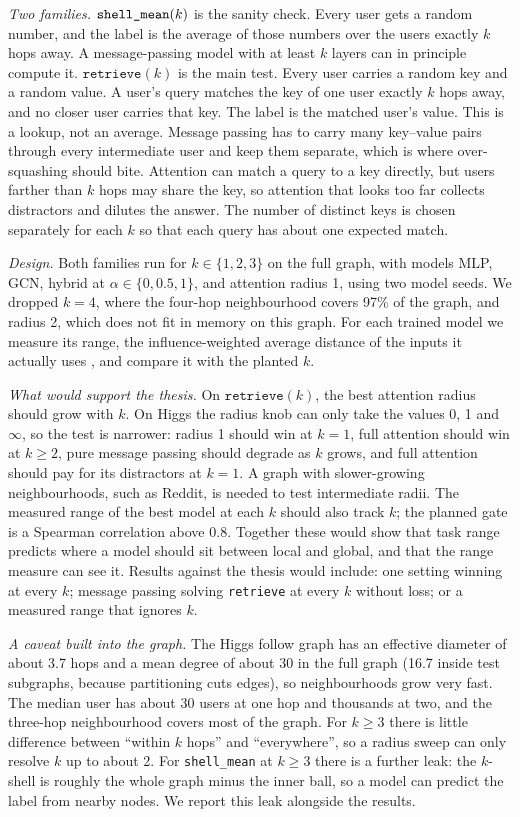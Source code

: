 \emph{Two families.} $\texttt{shell\_\allowbreak mean}(k)$ is the sanity check. Every user gets a random number, and the label is the average of those numbers over the users exactly $k$ hops away. A message-passing model with at least $k$ layers can in principle compute it. $\texttt{retrieve}(k)$ is the main test. Every user carries a random key and a random value. A user's query matches the key of one user exactly $k$ hops away, and no closer user carries that key. The label is the matched user's value. This is a lookup, not an average. Message passing has to carry many key--value pairs through every intermediate user and keep them separate, which is where over-squashing should bite. Attention can match a query to a key directly, but users farther than $k$ hops may share the key, so attention that looks too far collects distractors and dilutes the answer. The number of distinct keys is chosen separately for each $k$ so that each query has about one expected match.

\emph{Design.} Both families run for $k\in\{1,2,3\}$ on the full graph, with models MLP, GCN, hybrid at $\alpha\in\{0, 0.5, 1\}$, and attention radius 1, using two model seeds. We dropped $k=4$, where the four-hop neighbourhood covers 97\% of the graph, and radius 2, which does not fit in memory on this graph. For each trained model we measure its range, the influence-weighted average distance of the inputs it actually uses \citep{bamberger2025}, and compare it with the planted $k$.

\emph{What would support the thesis.} On $\texttt{retrieve}(k)$, the best attention radius should grow with $k$. On Higgs the radius knob can only take the values 0, 1 and $\infty$, so the test is narrower: radius 1 should win at $k=1$, full attention should win at $k\ge2$, pure message passing should degrade as $k$ grows, and full attention should pay for its distractors at $k=1$. A graph with slower-growing neighbourhoods, such as Reddit, is needed to test intermediate radii. The measured range of the best model at each $k$ should also track $k$; the planned gate is a Spearman correlation above 0.8. Together these would show that task range predicts where a model should sit between local and global, and that the range measure can see it. Results against the thesis would include: one setting winning at every $k$; message passing solving \texttt{retrieve} at every $k$ without loss; or a measured range that ignores $k$.

\emph{A caveat built into the graph.} The Higgs follow graph has an effective diameter of about 3.7 hops and a mean degree of about 30 in the full graph (16.7 inside test subgraphs, because partitioning cuts edges), so neighbourhoods grow very fast. The median user has about 30 users at one hop and thousands at two, and the three-hop neighbourhood covers most of the graph. For $k\ge3$ there is little difference between ``within $k$ hops'' and ``everywhere'', so a radius sweep can only resolve $k$ up to about 2. For \texttt{shell\_\allowbreak mean} at $k\ge3$ there is a further leak: the $k$-shell is roughly the whole graph minus the inner ball, so a model can predict the label from nearby nodes. We report this leak alongside the results.

